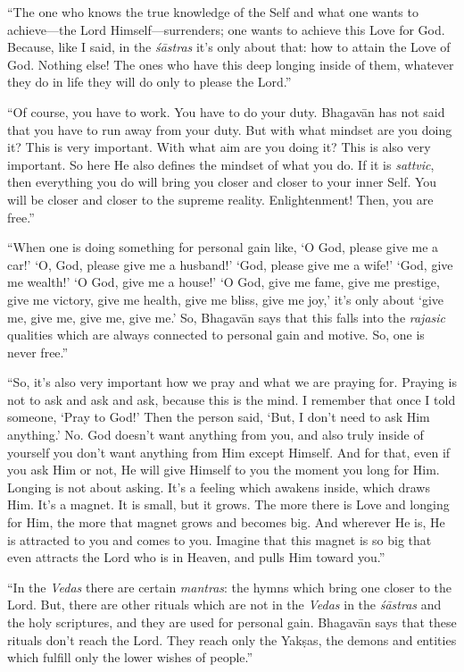 \enquote{The one who knows the true knowledge of the Self and what one wants to achieve---the Lord Himself---surrenders; one wants to achieve this Love for God. Because, like I said, in the \textit{śāstras} it’s only about that: how to attain the Love of God. Nothing else! The ones who have this deep longing inside of them, whatever they do in life they will do only to please the Lord.}

\enquote{Of course, you have to work. You have to do your duty. Bhagavān has not said that you have to run away from your duty. But with what mindset are you doing it? This is very important. With what aim are you doing it? This is also very important. So here He also defines the mindset of what you do. If it is \textit{sattvic}, then everything you do will bring you closer and closer to your inner Self. You will be closer and closer to the supreme reality. Enlightenment! Then, you are free.}

\enquote{When one is doing something for personal gain like, \enquote{O God, please give me a car!} \enquote{O, God, please give me a husband!} \enquote{God, please give me a wife!} \enquote{God, give me wealth!} \enquote{O God, give me a house!} \enquote{O God, give me fame, give me prestige, give me victory, give me health, give me bliss, give me joy,} it’s only about \enquote{give me, give me, give me, give me.} So, Bhagavān says that this falls into the \textit{rajasic} qualities which are always connected to personal gain and motive. So, one is never free.}

\enquote{So, it’s also very important how we pray and what we are praying for. Praying is not to ask and ask and ask, because this is the mind. I remember that once I told someone, \enquote{Pray to God!} Then the person said, \enquote{But, I don’t need to ask Him anything.} No. God doesn’t want anything from you, and also truly inside of yourself you don’t want anything from Him except Himself. And for that, even if you ask Him or not, He will give Himself to you the moment you long for Him. Longing is not about asking. It’s a feeling which awakens inside, which draws Him. It’s a magnet. It is small, but it grows. The more there is Love and longing for Him, the more that magnet grows and becomes big. And wherever He is, He is attracted to you and comes to you. Imagine that this magnet is so big that even attracts the Lord who is in Heaven, and pulls Him toward you.}

\enquote{In the \textit{Vedas} there are certain \textit{mantras}: the hymns which bring one closer to the Lord. But, there are other rituals which are not in the \textit{Vedas} in the \textit{śāstras} and the holy scriptures, and they are used for personal gain. Bhagavān says that these rituals don’t reach the Lord. They reach only the Yakṣas, the demons and entities which fulfill only the lower wishes of people.}

